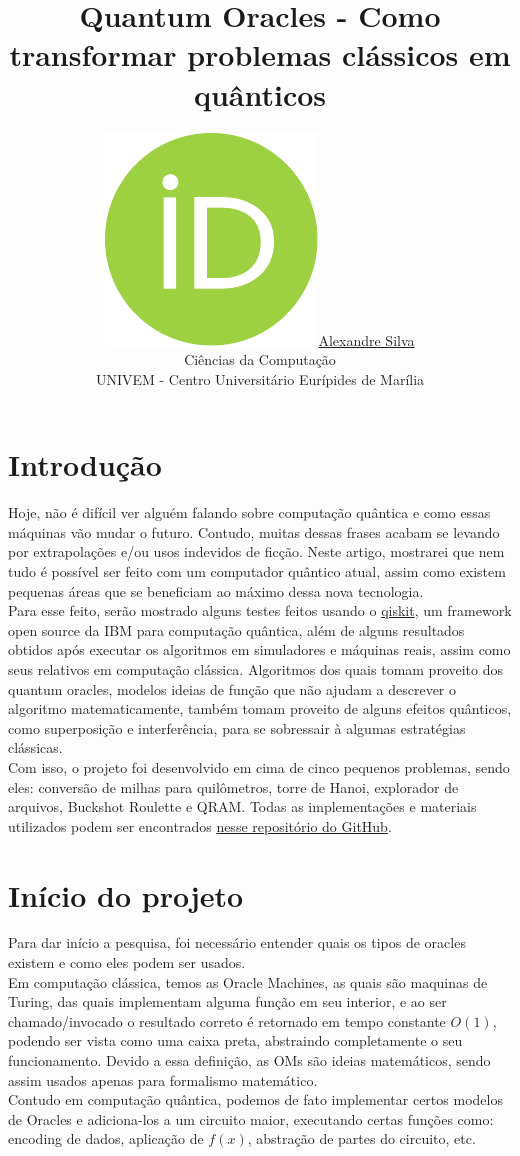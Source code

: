 \documentclass{article}
\title{Quantum Oracles - Como transformar problemas clássicos em quânticos}
\date{}
\author{ \href{https://orcid.org/0009-0008-9134-5974}{\includegraphics[scale=0.06]{orcid.pdf}\hspace{1mm}Alexandre Silva}\\
	Ciências da Computação\\
	UNIVEM - Centro Universitário Eurípides de Marília\\
}
\begin{document}
\maketitle
\begin{abstract}
	
\end{abstract}


\section{Introdução}
Hoje, não é difícil ver alguém falando sobre computação quântica e como essas máquinas vão mudar o futuro. Contudo, muitas dessas frases acabam se levando por extrapolações e/ou usos indevidos de ficção. Neste artigo, mostrarei que nem tudo é possível ser feito com um computador quântico atual, assim como existem pequenas áreas que se beneficiam ao máximo dessa nova tecnologia.\\
Para esse feito, serão mostrado alguns testes feitos usando o \href{https://www.ibm.com/quantum/qiskit}{qiskit}, um framework open source da IBM para computação quântica, além de alguns resultados obtidos após executar os algoritmos em simuladores e máquinas reais, assim como seus relativos em computação clássica. Algoritmos dos quais tomam proveito dos quantum oracles, modelos ideias de função que não ajudam a descrever o algoritmo matematicamente, também tomam proveito de alguns efeitos quânticos, como superposição e interferência, para se sobressair à algumas estratégias clássicas.\\
Com isso, o projeto foi desenvolvido em cima de cinco pequenos problemas, sendo eles: conversão de milhas para quilômetros, torre de Hanoi, explorador de arquivos, Buckshot Roulette e QRAM. Todas as implementações e materiais utilizados podem ser encontrados \href{https://github.com/Dpbm/scientific-initiation-1-quantum-oracles}{nesse repositório do GitHub}.


\section{Início do projeto}
Para dar início a pesquisa, foi necessário entender quais os tipos de oracles existem e como eles podem ser usados.\\
Em computação clássica, temos as Oracle Machines, as quais são maquinas de Turing, das quais implementam alguma função em seu interior, e ao ser chamado/invocado o resultado correto é retornado em tempo constante $O(1)$, podendo ser vista como uma caixa preta, abstraindo completamente o seu funcionamento. Devido a essa definição, as OMs são ideias matemáticos, sendo assim usados apenas para formalismo matemático.\\
Contudo em computação quântica, podemos de fato implementar certos modelos de Oracles e adiciona-los a um circuito maior, executando certas funções como: encoding de dados, aplicação de $f(x)$, abstração de partes do circuito, etc.
\end{document}
